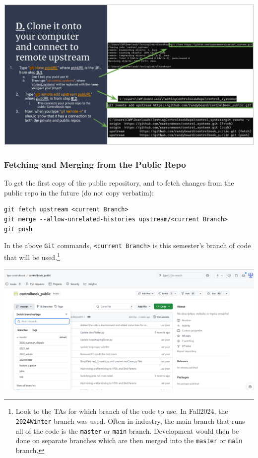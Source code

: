 \documentclass{article}
\begin{document}
 
\begin{center}
    \includegraphics[width=\linewidth]{pic7e2.png} %
\end{center}

\subsubsection{Fetching and Merging from the Public Repo}
\label{copy-repo}
To get the first copy of the public repository, and to fetch changes from the public repo in the future (do not copy verbatim):

\begin{verbatim}
git fetch upstream <current Branch>
git merge --allow-unrelated-histories upstream/<current Branch>
git push
\end{verbatim}



In the above \texttt{Git} commands, \texttt{<current Branch>} is this semester's branch of code that will be used.\footnote{Look to the TAs for which branch of the code to use. In Fall2024, the \texttt{2024Winter} branch was used. Often in industry, the main branch that runs all of the code is the \texttt{master} or \texttt{main} branch. Development would then be done on separate branches which are then merged into the \texttt{master} or \texttt{main} branch.} 

\begin{center}
    \includegraphics[width=\linewidth]{pic7f-differentBranches.png} 
\end{center}
\end{document}
